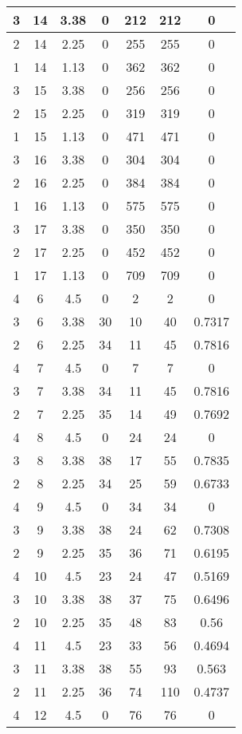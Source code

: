 \documentclass[letterpaper, 12pt]{article}
\begin{document}
\begin{longtable}{|c|c|c|c|c|c|c|}
\hline
3 & 14 & 3.38 & 0 & 212 & 212 & 0 \\
\hline
2 & 14 & 2.25 & 0 & 255 & 255 & 0 \\
\hline
1 & 14 & 1.13 & 0 & 362 & 362 & 0 \\
\hline
3 & 15 & 3.38 & 0 & 256 & 256 & 0 \\
\hline
2 & 15 & 2.25 & 0 & 319 & 319 & 0 \\
\hline
1 & 15 & 1.13 & 0 & 471 & 471 & 0 \\
\hline
3 & 16 & 3.38 & 0 & 304 & 304 & 0 \\
\hline
2 & 16 & 2.25 & 0 & 384 & 384 & 0 \\
\hline
1 & 16 & 1.13 & 0 & 575 & 575 & 0 \\
\hline
3 & 17 & 3.38 & 0 & 350 & 350 & 0 \\
\hline
2 & 17 & 2.25 & 0 & 452 & 452 & 0 \\
\hline
1 & 17 & 1.13 & 0 & 709 & 709 & 0 \\
\hline
4 & 6 & 4.5 & 0 & 2 & 2 & 0 \\
\hline
3 & 6 & 3.38 & 30 & 10 & 40 & 0.7317 \\
\hline
2 & 6 & 2.25 & 34 & 11 & 45 & 0.7816 \\
\hline
4 & 7 & 4.5 & 0 & 7 & 7 & 0 \\
\hline
3 & 7 & 3.38 & 34 & 11 & 45 & 0.7816 \\
\hline
2 & 7 & 2.25 & 35 & 14 & 49 & 0.7692 \\
\hline
4 & 8 & 4.5 & 0 & 24 & 24 & 0 \\
\hline
3 & 8 & 3.38 & 38 & 17 & 55 & 0.7835 \\
\hline
2 & 8 & 2.25 & 34 & 25 & 59 & 0.6733 \\
\hline
4 & 9 & 4.5 & 0 & 34 & 34 & 0 \\
\hline
3 & 9 & 3.38 & 38 & 24 & 62 & 0.7308 \\
\hline
2 & 9 & 2.25 & 35 & 36 & 71 & 0.6195 \\
\hline
4 & 10 & 4.5 & 23 & 24 & 47 & 0.5169 \\
\hline
3 & 10 & 3.38 & 38 & 37 & 75 & 0.6496 \\
\hline
2 & 10 & 2.25 & 35 & 48 & 83 & 0.56 \\
\hline
4 & 11 & 4.5 & 23 & 33 & 56 & 0.4694 \\
\hline
3 & 11 & 3.38 & 38 & 55 & 93 & 0.563 \\
\hline
2 & 11 & 2.25 & 36 & 74 & 110 & 0.4737 \\
\hline
4 & 12 & 4.5 & 0 & 76 & 76 & 0 \\

\end{longtable}
\end{document}
